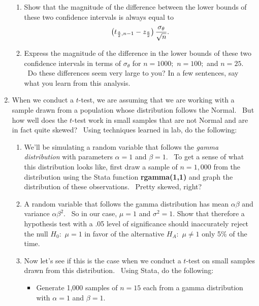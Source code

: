 \documentclass[11pt]{article}
\begin{document}
\begin{enumerate}
\begin{enumerate}
\item Show that the magnitude of the difference between the lower bounds of
these two confidence intervals is always equal to%
\begin{equation*}
\left( t_{\frac{a}{2},n-1}-z_{\frac{a}{2}}\right) \frac{\sigma _{\theta }}{%
\sqrt{n}}.
\end{equation*}

\item Express the magnitude of the difference in the lower bounds of these
two confidence intervals in terms of $\sigma _{\theta }$ for $n=1000;$ $%
n=100;$ and $n=25.$ \ Do these differences seem very large to you? In a few
sentences, say what you learn from this analysis.\medskip
\end{enumerate}

\item When we conduct a $t$-test, we are assuming that we are working with a
sample drawn from a population whose distribution follows the Normal. \ But
how well does the $t$-test work in small samples that are not Normal and are
in fact quite skewed? \ Using techniques learned in lab, do the following:

\begin{enumerate}
\item We'll be simulating a random variable that follows the \textit{gamma
distribution} with parameters $\alpha =1$ and $\beta =1.$ \ To get a sense
of what this distribution looks like, first draw a sample of $n=1,000$ from
the distribution using the Stata function \textbf{rgamma(1,1) }and graph the
distribution of these observations. \ Pretty skewed, right?

\item A random variable that follows the gamma distribution has mean $\alpha
\beta $ and variance $\alpha \beta ^{2}.$ \ So in our case, $\mu =1$ and $%
\sigma ^{2}=1.$ Show that therefore a hypothesis test with a .05 level of
significance should inaccurately reject the null $H_{0}:$ $\mu =1$ in favor
of the alternative $H_{A}:$ $\mu \neq 1$ only 5\% of the time. \ 

\item Now let's see if this is the case when we conduct a $t$-test on small
samples drawn from this distribution. \ Using Stata, do the following:

\begin{itemize}
\item Generate 1,000 samples of $n=15$ each from a gamma distribution with $%
\alpha =1$ and $\beta =1.$


\end{itemize}
\end{enumerate}
\end{enumerate}
\end{document}
